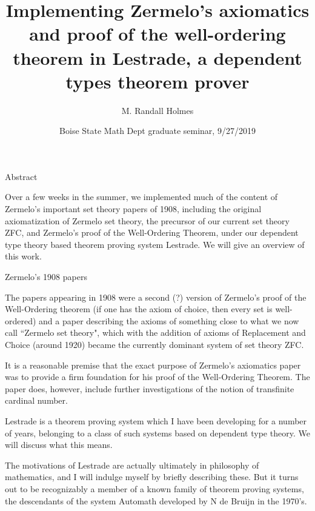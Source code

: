 \documentclass{slides}
\title{Implementing Zermelo's axiomatics and proof of the well-ordering theorem in Lestrade, a dependent types theorem prover}
\author{M. Randall Holmes}
\date{Boise State Math Dept graduate seminar, 9/27/2019}
\begin{document}
\begin{slide}

\maketitle

\end{slide}

\begin{slide}

{\Large Abstract}

Over a few weeks in the summer, we implemented much of the content of Zermelo's important set theory papers of 1908, including the original axiomatization of Zermelo set theory, the precursor of our current set theory ZFC, and Zermelo's proof of the Well-Ordering Theorem, under our dependent type theory based theorem proving system Lestrade.  We will give an overview of this work.


\end{slide}

\begin{slide}

{\Large Zermelo's 1908 papers}

The papers appearing in 1908 were a second (?) version of Zermelo's proof of the Well-Ordering theorem (if one has the axiom of choice, then every set is well-ordered) and a paper describing the axioms of something close to what we now call ``Zermelo set theory", which with the addition of axioms of Replacement and Choice (around 1920) became the currently dominant system of set theory ZFC.

It is a reasonable premise that the exact purpose of Zermelo's axiomatics paper was to provide a firm foundation for his proof of the Well-Ordering Theorem.  The paper does, however, include further investigations of the notion of transfinite cardinal number.

\end{slide}

\begin{slide}

Lestrade is a theorem proving system which I have been developing for a number of years, belonging to a class of such systems based on dependent type theory.  We will discuss what this means.

The motivations of Lestrade are actually ultimately in philosophy of mathematics, and I will indulge myself by briefly describing these.  But it turns out to be recognizably a member of a known family of theorem proving systems, the descendants of the system Automath developed by N de Bruijn in the 1970's.

\end{slide}
\end{document}
